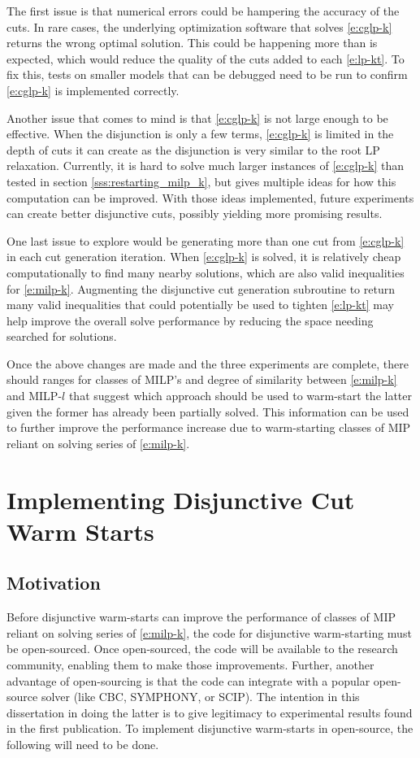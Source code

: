 \documentclass[10pt]{article}
\begin{document}
	The first issue is that numerical errors could be hampering the accuracy of the cuts. In rare cases, the underlying optimization software that solves \ref{e:cglp-k} returns the wrong optimal solution. This could be happening more than is expected, which would reduce the quality of the cuts added to each \ref{e:lp-kt}. To fix this, tests on smaller models that can be debugged need to be run to confirm \ref{e:cglp-k} is implemented correctly.
	
	Another issue that comes to mind is that \ref{e:cglp-k} is not large enough to be effective. When the disjunction is only a few terms, \ref{e:cglp-k} is limited in the depth of cuts it can create as the disjunction is very similar to the root LP relaxation. Currently, it is hard to solve much larger instances of \ref{e:cglp-k} than tested in section \ref{sss:restarting_milp_k}, but \cite{aleks} gives multiple ideas for how this computation can be improved. With those ideas implemented, future experiments can create better disjunctive cuts, possibly yielding more promising results.
	
	One last issue to explore would be generating more than one cut from \ref{e:cglp-k} in each cut generation iteration. When \ref{e:cglp-k} is solved, it is relatively cheap computationally to find many nearby solutions, which are also valid inequalities for \ref{e:milp-k}. Augmenting the disjunctive cut generation subroutine to return many valid inequalities that could potentially be used to tighten \ref{e:lp-kt} may help improve the overall solve performance by reducing the space needing searched for solutions.
	
	Once the above changes are made and the three experiments are complete, there should ranges for classes of MILP's and degree of similarity between \ref{e:milp-k} and MILP-$ l $ that suggest which approach should be used to warm-start the latter given the former has already been partially solved. This information can be used to further improve the performance increase due to warm-starting classes of MIP reliant on solving series of \ref{e:milp-k}. 
	
	\section{Implementing Disjunctive Cut Warm Starts} \label{s:implementing}
	
	\subsection{Motivation} \label{ss:implementation_motivation}
	Before disjunctive warm-starts can improve the performance of classes of MIP reliant on solving series of \ref{e:milp-k}, the code for disjunctive warm-starting must be open-sourced. Once open-sourced, the code will be available to the research community, enabling them to make those improvements. Further, another advantage of open-sourcing is that the code can integrate with a popular open-source solver (like CBC, SYMPHONY, or SCIP). The intention in this dissertation in doing the latter is to give legitimacy to experimental results found in the first publication. To implement disjunctive warm-starts in open-source, the following will need to be done.
	
\end{document}
